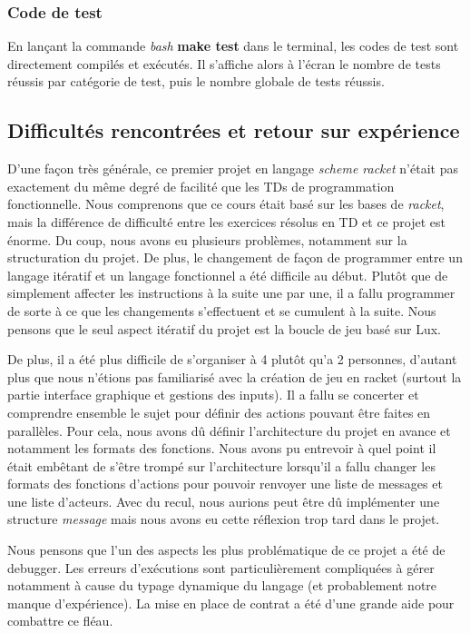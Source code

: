 \documentclass{article}
\begin{document}
\subsubsection{Code de test}
En lançant la commande \textit{bash} \textbf{make test} dans le terminal, les codes de test sont directement compilés et exécutés. Il s'affiche alors à l'écran le nombre de tests réussis par catégorie de test, puis le nombre globale de tests réussis. 

\subsection{Difficultés rencontrées et retour sur expérience}
D'une façon très générale, ce premier projet en langage \textit{scheme racket} n'était pas exactement du même degré de facilité que les TDs de programmation fonctionnelle.
Nous comprenons que ce cours était basé sur les bases de \textit{racket}, mais la différence de difficulté entre les exercices résolus en TD et ce projet est énorme. Du coup, nous avons eu plusieurs problèmes, notamment sur la structuration du projet. 
De plus, le changement de façon de programmer entre un langage itératif et un langage fonctionnel a été difficile au début. Plutôt que de simplement affecter les instructions à la suite une par une, il a fallu programmer de sorte à ce que les changements s'effectuent et se cumulent à la suite. Nous pensons que le seul aspect itératif du projet est la boucle de jeu basé sur Lux.

De plus, il a été plus difficile de s'organiser à 4 plutôt qu'a 2 personnes, d'autant plus que nous n'étions pas familiarisé avec la création de jeu en racket (surtout la partie interface graphique et gestions des inputs). Il a fallu se concerter et comprendre ensemble le sujet pour définir des actions pouvant être faites en parallèles. Pour cela, nous avons dû définir l'architecture du projet en avance et notamment les formats des fonctions. Nous avons pu entrevoir à quel point il était embêtant de s'être trompé sur l'architecture lorsqu'il a fallu changer les formats des fonctions d'actions pour pouvoir renvoyer une liste de messages et une liste d'acteurs. Avec du recul, nous aurions peut être dû implémenter une structure \textit{message} mais nous avons eu cette réflexion trop tard dans le projet.

Nous pensons que l'un des aspects les plus problématique de ce projet a été de debugger. Les erreurs d'exécutions sont particulièrement compliquées à gérer notamment à cause du typage dynamique du langage (et probablement notre manque d'expérience). La mise en place de contrat a été d'une grande aide pour combattre ce fléau.
\end{document}
